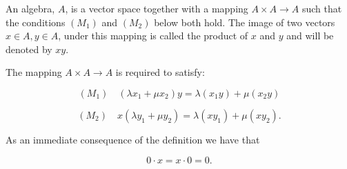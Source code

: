 An algebra, $A$, is a vector space together with a mapping $A \times A \rightarrow A$ such that the conditions $(M_1)$ and $(M_2)$ below both hold. The image of two vectors $x \in A, y \in A$, under this mapping is called the product of $x$ and $y$ and will be denoted by $xy$.

The mapping $A \times A \rightarrow A$ is required to satisfy:

$$(M_1) \quad (\lambda x_1 + \mu x_2) y = \lambda(x_1 y) + \mu(x_2 y)$$

$$(M_2) \quad x(\lambda y_1 + \mu y_2) = \lambda(x y_1) + \mu(x y_2).$$

As an immediate consequence of the definition we have that

$$0 \cdot x = x \cdot 0 = 0.$$
